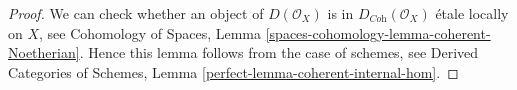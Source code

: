 \documentclass[10pt,a4paper]{amsart}
\theoremstyle{plain}
\theoremstyle{definition}
\theoremstyle{remark}
\numberwithin{equation}{subsection}
\begin{document}
\begin{proof}
We can check whether an object of $D(\mathcal{O}_X)$ is in
$D_{\textit{Coh}}(\mathcal{O}_X)$ \'etale locally on $X$, see
Cohomology of Spaces, Lemma \ref{spaces-cohomology-lemma-coherent-Noetherian}.
Hence this lemma follows from the case of schemes, see
Derived Categories of Schemes, Lemma \ref{perfect-lemma-coherent-internal-hom}.
\end{proof}
\end{document}
